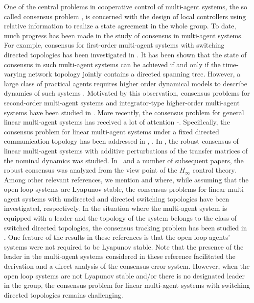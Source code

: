 \documentclass[letterpaper, 10 pt, conference]{ieeeconf}
\begin{document}
One of the central problems in cooperative control of multi-agent systems,
the so called consensus problem \cite{Jadbabaie2003TAC,SaberMurrayTAC2005},
is concerned with the design of local controllers using relative information
to realize a state agreement in the whole group. To date, much progress has
been made in the study of consensus in multi-agent systems. For example,
consensus for first-order multi-agent systems with switching directed
topologies has been investigated in
\cite{RenBeard2005TAC,Moreau2005TAC}. It has
been shown that the state of consensus in such multi-agent systems can
be achieved if and only if the time-varying network topology jointly
contains a directed spanning tree. However, a large class of practical
agents requires higher order dynamical models to describe dynamics of such
systems \cite{RenJIRS2007}. Motivated by this observation, consensus
problems for second-order multi-agent systems and integrator-type
higher-order multi-agent systems have been studied in
\cite{RenAtkinsRNC2007,WenDuanYuChenRNC2012,WielandKimFrankIJSS2011}. More recently, the consensus problem for general linear multi-agent systems has
received a lot of  attention
 \cite{LiDuanChenHuangTCASI2010}-\cite{WenDuanRenChenRNC}. Specifically,
the consensus problem for linear multi-agent systems under a fixed directed
 communication topology has been addressed in
 \cite{LiDuanChenHuangTCASI2010}, \cite{ZhangFrankDas2011TAC}. In
 \cite{TrentelmanTakabaMonshizadehIEEETAC2013}, the robust consensus of linear
 multi-agent systems with additive perturbations of the transfer matrices
 of the nominal dynamics was studied. In~\cite{Ugrinovskii2011Automatica}
 and a number of subsequent papers, the robust consensus  was analyzed from
 the view point of the $H_\infty$ control theory.
Among other relevant references, we mention \cite{SuHuangTAC2012} and
\cite{WuQinYuAllgowerCDC2013} where, while assuming that the open loop
systems are Lyapunov stable, the consensus problems for linear multi-agent
systems with undirected and directed switching topologies have been
investigated, respectively. In the situation where the multi-agent
system is equipped with a leader and the topology of the system
belongs to the class of switched directed topologies, the consensus
tracking problem has been studied in
\cite{WenHuYuChenCaoSCL2013,WenDuanRenChenRNC}. One  feature of the results in these references
 is that the open loop agents' systems were not
required to be Lyapunov stable. Note that the presence of the leader in
the multi-agent systems considered in these reference facilitated the
derivation and a direct
analysis of the consensus error system. However, when the open loop systems are
not Lyapunov stable and/or there is no designated leader in the group, the
consensus problem for linear multi-agent systems with switching directed
topologies remains challenging.
\end{document}
